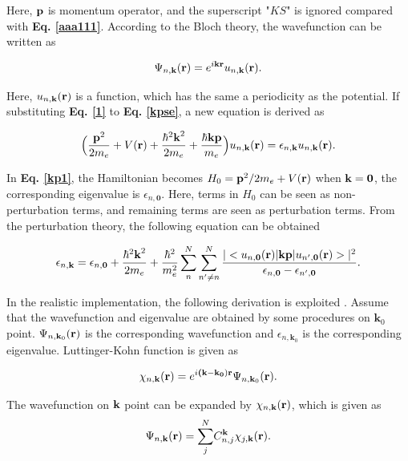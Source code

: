 \documentclass[a4paper, 12pt, titlepage,oneside,drop]{kthesis}
\begin{document}
Here, $\textbf p$ is momentum operator, and the superscript "$KS$" is ignored compared with \textbf{Eq. \ref{aaa111}}. According to the Bloch theory, the wavefunction can be written as

\begin{equation}\label{1}
 \wfbloch<n><\bold k> = \expg<k> \ubloch<n><\bold k>.
\end{equation}

Here, $\ubloch<n><\bold k>$ is a function, which has the same a periodicity as the potential. If substituting \textbf{Eq. \ref{1}} to \textbf{Eq. \ref{kpse}}, a new equation is derived as

\begin{equation}\label{kp1}
 \Big(  \frac{{\textbf p}^2}{2m_e} + V({\textbf r }) + \frac{{\hbar^2 {\textbf k}^2}}{2m_e} + \frac{{\hbar \textbf {kp}}}{m_e} \Big) \ubloch<n><\bold  k>  =  \epsilon_{n,\textbf{k}} \ubloch<n><\bold  k>.
\end{equation}

In \textbf{Eq. \ref{kp1}}, the Hamiltonian becomes $H_0 = {\textbf p}^2 / {2m_e} + V({\textbf r })$ when $\textbf k = \textbf 0$, the corresponding eigenvalue is $\epsilon_{n,\textbf{0}}$. 
Here, terms in $H_0$ can be seen as non-perturbation terms, and remaining terms are seen as perturbation terms. From the perturbation theory, the following equation can be obtained  

\begin{equation}
 \epsilon_{n,\textbf{k}} =  \epsilon_{n,\textbf{0}} + \frac{{\hbar^2 {\textbf k}^2}}{2m_e} + \frac{ \hbar^2}{m_{e}^2} \sum\limits_n^{N} \sum\limits_{n' \neq n}^{N} \frac{|<\ubloch<n><\bold 0>|{\textbf {kp}}|\ubloch<n'><\bold  0>>|^2}{\epsilon_{n,\textbf 0} - \epsilon_{n',\textbf 0}}.
\end{equation}

In the realistic implementation, the following derivation is exploited \cite{persson2007full}. Assume that the wavefunction and eigenvalue are obtained by some procedures on $\textbf{k}_0$ point. $\wfbloch<n><\bold{k}_0>$ is the corresponding wavefunction
and $\epsilon_{n,\textbf{k}_0}$ is the corresponding eigenvalue. Luttinger-Kohn function is given as

\begin{equation}\label{kp2}
\chikp<n><\textbf k> = \expg<(\bold k-\bold {k_0})>  \wfbloch<n><\textbf{k}_0>.
\end{equation}

The wavefunction on ${ \textbf k}$ point can be expanded by $\chikp<n><\textbf k> $, which is given as
\begin{equation}\label{kp3}
\wfbloch<n><\bold k> =  {\sum\limits_{j}^{N}} C_{n,j}^{\bold k} \chikp<j><\bold k>. 
\end{equation}
\end{document}
